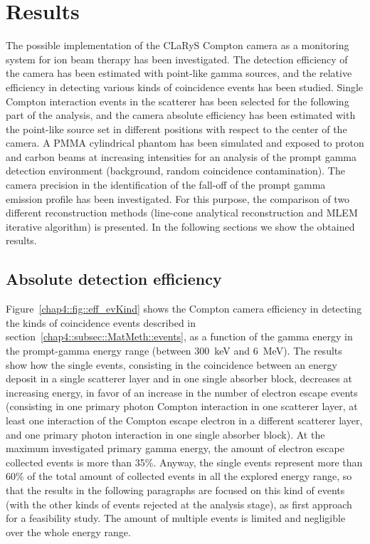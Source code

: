\section{Results}\label{chap4::sec::results}

The possible implementation of the CLaRyS Compton camera as a monitoring system for ion beam therapy has been investigated. The detection efficiency of the camera has been estimated with point-like gamma sources, and the relative efficiency in detecting various kinds of coincidence events has been studied. Single Compton interaction events in the scatterer has been selected for the following part of the analysis, and the camera absolute efficiency has been estimated with the point-like source set in different positions with respect to the center of the camera. A PMMA cylindrical phantom has been simulated and exposed to proton and carbon beams at increasing intensities for an analysis of the prompt gamma detection environment (background, random coincidence contamination). The camera precision in the identification of the fall-off of the prompt gamma emission profile has been investigated. For this purpose, the comparison of two different reconstruction methods (line-cone analytical reconstruction and MLEM iterative algorithm) is presented. In the following sections we show the obtained results. 


\subsection{Absolute detection efficiency}\label{chap4::subsec::Results::efficiency}
Figure~\ref{chap4::fig::eff_evKind} shows the Compton camera efficiency in detecting the kinds of coincidence events described in section~\ref{chap4::subsec::MatMeth::events}, as a function of the gamma energy in the prompt-gamma energy range (between 300~keV and 6~MeV). The results show how the single events, consisting in the coincidence between an energy deposit in a single scatterer layer and in one single absorber block, decreases at increasing energy, in favor of an increase in the number of electron escape events (consisting in one primary photon Compton interaction in one scatterer layer, at least one interaction of the Compton escape electron in a different scatterer layer, and one primary photon interaction in one single absorber block). At the maximum investigated primary gamma energy,  the amount of electron escape collected events is more than 35\%. Anyway, the single events represent more than 60\% of the total amount of collected events in all the explored energy range, so that the results in the following paragraphs are focused on this kind of events (with the other kinds of events rejected at the analysis stage), as first approach for a feasibility study. The amount of multiple events is limited and negligible over the whole energy range.

